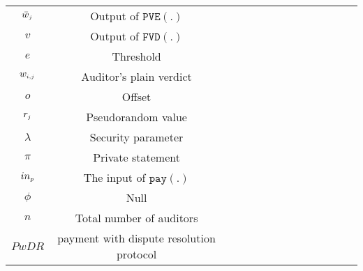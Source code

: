 \begin{table}[!htbp]
\begin{scriptsize}
\begin{center}
{{\begin{tabular}{|c|c|c|c|c|c|c|c|c|c|c|c|c|c|}
%
\cellcolor{white!20}\scriptsize$\bar{w}_{\scriptscriptstyle j}$ &\cellcolor{white!20}\scriptsize  Output of $\mathtt{PVE}(.)$\\ 
%
\cellcolor{gray!20}\scriptsize$v$ &\cellcolor{gray!20}\scriptsize  Output of $\mathtt{FVD}(.)$\\ 
%
\cellcolor{white!20}\scriptsize$e$ &\cellcolor{white!20}\scriptsize  Threshold\\ 
%            
 \cellcolor{gray!20}\scriptsize$w_{\scriptscriptstyle i,j}$ &\cellcolor{gray!20}\scriptsize  Auditor's plain verdict\\ 
%     
\cellcolor{white!20}\scriptsize$o$ &\cellcolor{white!20}\scriptsize  Offset\\  
  \cellcolor{gray!20}\scriptsize$r_{\scriptscriptstyle j}$ &\cellcolor{gray!20}\scriptsize  Pseudorandom value\\   
\cellcolor{white!20}\scriptsize$\lambda$ &\cellcolor{white!20}\scriptsize Security parameter\\  
%


                
%
\cellcolor{gray!20}\scriptsize$\pi$ &\cellcolor{gray!20}\scriptsize Private statement\\        
\cellcolor{white!20}\scriptsize$in_{\scriptscriptstyle p}$ &\cellcolor{white!20}\scriptsize The input of $\mathtt{pay}(.)$\\    
%
\cellcolor{gray!20}\scriptsize$\phi$ &\cellcolor{gray!20}\scriptsize  Null\\ 
%
\cellcolor{white!20}\scriptsize$n$ &\cellcolor{white!20}\scriptsize  Total number of auditors\\  
%           
%
%
%
\cellcolor{gray!20}\scriptsize$PwDR$ &\cellcolor{gray!20}\scriptsize  payment with dispute resolution protocol\\ 
\hline 

      

           
              
\end{tabular}\label{table:notation-table}
%
}
}
\end{center}
\end{scriptsize}
\end{table}

